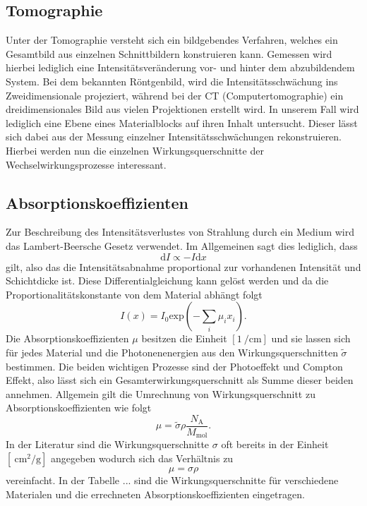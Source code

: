 \subsection{Tomographie}
Unter der Tomographie versteht sich ein bildgebendes Verfahren, welches ein Gesamtbild aus einzelnen Schnittbildern konstruieren kann. Gemessen wird hierbei
lediglich eine Intensitätsveränderung vor- und hinter dem abzubildendem System. 
Bei dem bekannten Röntgenbild, wird die Intensitätsschwächung ins Zweidimensionale projeziert, während bei der CT (Computertomographie) ein dreidimensionales Bild aus vielen Projektionen erstellt wird. 
In unserem Fall wird lediglich eine Ebene eines Materialblocks auf ihren Inhalt untersucht. Dieser lässt sich dabei aus der Messung einzelner Intensitätsschwächungen rekonstruieren. 
Hierbei werden nun die einzelnen Wirkungsquerschnitte der Wechselwirkungsprozesse interessant.
\subsection{Absorptionskoeffizienten}
Zur Beschreibung des Intensitätsverlustes von Strahlung durch ein Medium wird das Lambert-Beersche Gesetz verwendet. Im Allgemeinen sagt dies lediglich, dass
\begin{equation*}
\text{d}I \propto -I \text{d}x
\end{equation*}
gilt, also das die Intensitätsabnahme proportional zur vorhandenen Intensität und Schichtdicke ist. Diese Differentialgleichung kann gelöst werden und da die Proportionalitätskonstante von dem Material abhängt folgt
\begin{equation}
    \label{eqn:ayoo}
I(x) = I_0 \text{exp}\left(- \sum_{i}^{} \mu_i x_i \right).
\end{equation}
Die Absorptionskoeffizienten $\mu$ besitzen die Einheit $[\SI{1}{\per\centi\meter}]$ und sie lassen sich für jedes Material und die Photonenenergien aus den Wirkungsquerschnitten $\tilde{\sigma}$ bestimmen. Die beiden wichtigen Prozesse sind der Photoeffekt und Compton Effekt,
also lässt sich ein Gesamterwirkungsquerschnitt als Summe dieser beiden annehmen. Allgemein gilt die Umrechnung von Wirkungsquerschnitt zu Absorptionskoeffizienten wie folgt \cite{hier}
\begin{equation}
\mu = \tilde{\sigma} \rho \frac{N_\text{A}}{M_{\text{mol}}}.
\end{equation}
In der Literatur sind die Wirkungsquerschnitte $\sigma$ oft bereits in der Einheit $[\SI{}{\centi\meter\squared\per\gram}]$ angegeben wodurch sich das Verhältnis zu 
\begin{equation}
\mu = \sigma \rho
\end{equation}
vereinfacht. In der Tabelle ... sind die Wirkungsquerschnitte für verschiedene Materialen \cite{wqs} und die errechneten Absorptionskoeffizienten eingetragen. 
